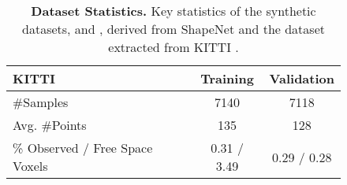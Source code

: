 \begin{table}
\begin{subfigure}[t]{0.5\textwidth}
        {\small
        \begin{tabularx}{0.95\textwidth}{|X|c|c|}
            \hline
            KITTI
            & Training
            & Validation\\
            \hline
            \#Samples & 7140 & 7118\\
            Avg. \#Points & 135 & 128\\
            \% Observed / Free Space Voxels & 0.31 / 3.49 & 0.29 / 0.28\\
            \hline
        \end{tabularx}
        }
    \end{subfigure}
    \caption{{\bf Dataset Statistics.} Key statistics of the synthetic datasets, \clean and \noisy, derived from ShapeNet \cite{Chang2015ARXIV} and the dataset extracted from KITTI \cite{Geiger2012CVPR}.}
    \label{table:experiments-data}
\end{table}
\vspace*{-0.25cm}